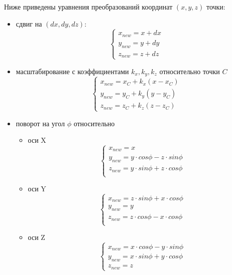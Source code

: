 \vspace{0.2cm}Ниже приведены уравнения преобразований координат $(x, y, z)$ точки: 
\begin{itemize}
	\item сдвиг на $(dx, dy, dz)$:
		\begin{equation}
		\begin{cases}
		x_{new} = x + dx\\
		y_{new} = y + dy\\
		z_{new} = z + dz
		\end{cases}
		\label{eq:shift}
		\end{equation}
	\item масштабирование с коэффициентами $k_x, k_y, k_z$ относительно точки $C$
		\begin{equation}
		\begin{cases}
		x_{new} = x_C + k_x (x - x_C)\\
		y_{new} = y_C + k_y (y - y_C)\\
		z_{new} = z_C + k_z (z - z_C)
		\end{cases}
		\label{eq:scale}
		\end{equation}
	\item поворот на угол $\phi$ относительно
	\begin{itemize}
		\item оси X
			\begin{equation}
			\begin{cases}
			x_{new} = x\\
			y_{new} = y \cdot cos\phi - z \cdot sin\phi\\
			z_{new} = y \cdot sin\phi + z \cdot cos\phi\\
			\end{cases}
			\label{eq:rotx}
			\end{equation}
		\item оси Y
			\begin{equation}
			\begin{cases}
			x_{new} = z \cdot sin\phi + x \cdot cos\phi\\
			y_{new} = y\\
			z_{new} = z \cdot cos\phi - x \cdot cos\phi\\
			\end{cases}
			\label{eq:roty}
			\end{equation}
		\item оси Z
			\begin{equation}
			\begin{cases}
			x_{new} = x \cdot cos\phi - y \cdot sin\phi\\
			y_{new} = x \cdot sin\phi + y \cdot cos\phi\\
			z_{new} = z
			\end{cases}
			\label{eq:rotz}
			\end{equation}
	\end{itemize}
\end{itemize}

